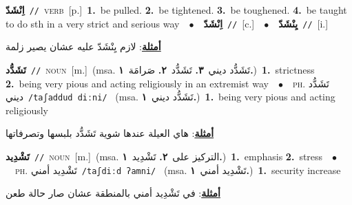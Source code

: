 \documentclass[10pt,a4paper,twoside]{article} %
\begin{document}
\begin{multicols}{2}
{\setlength\topsep{0pt}\textbf{\foreignlanguage{arabic}{اِنْشَدّ}}\ {\color{gray}\texttt{//}\color{black}}\ \textsc{verb}\ [p.]\ \textbf{1.}~be pulled.  \textbf{2.}~be tightened.  \textbf{3.}~be toughened.  \textbf{4.}~be taught to do sth in a very strict and serious way\ \ $\bullet$\ \ \setlength\topsep{0pt}\textbf{\foreignlanguage{arabic}{اِنْشَدّ}}\ {\color{gray}\texttt{//}\color{black}}\ [c.]\ \ $\bullet$\ \ \setlength\topsep{0pt}\textbf{\foreignlanguage{arabic}{يِنْشَدّ}}\ {\color{gray}\texttt{//}\color{black}}\ [i.]\  \begin{flushright}\color{gray}\foreignlanguage{arabic}{\textbf{\underline{\foreignlanguage{arabic}{أمثلة}}}: لازم يِنْشَدّ عليه عشان يصير زلمة}\end{flushright}\color{black}} \vspace{2mm}

{\setlength\topsep{0pt}\textbf{\foreignlanguage{arabic}{تَشَدُّد}}\ {\color{gray}\texttt{//}\color{black}}\ \textsc{noun}\ [m.]\ \color{gray}(msa. \foreignlanguage{arabic}{تَشَدُّد ديني}~\foreignlanguage{arabic}{\textbf{٣.}}  \foreignlanguage{arabic}{تَشَدُّد}~\foreignlanguage{arabic}{\textbf{٢.}}  \foreignlanguage{arabic}{صَرامَة}~\foreignlanguage{arabic}{\textbf{١.}})\color{black}\ \textbf{1.}~strictness  \textbf{2.}~being very pious and acting religiously in an extremist way\ \ $\bullet$\ \ \textsc{ph.} \color{gray} \foreignlanguage{arabic}{تَشَدُّد ديني}\color{black}\ {\color{gray}\texttt{/{\sffamily taʃaddud diːni}/}\color{black}}\ \color{gray} (msa. \foreignlanguage{arabic}{تَشَدُّد ديني}~\foreignlanguage{arabic}{\textbf{١.}})\color{black}\ \textbf{1.}~being very pious and acting religiously\  \begin{flushright}\color{gray}\foreignlanguage{arabic}{\textbf{\underline{\foreignlanguage{arabic}{أمثلة}}}: هاي العيلة عندها شوية تَشَدُّد بلبسها وتصرفاتها}\end{flushright}\color{black}} \vspace{2mm}

{\setlength\topsep{0pt}\textbf{\foreignlanguage{arabic}{تَشْدِيد}}\ {\color{gray}\texttt{//}\color{black}}\ \textsc{noun}\ [m.]\ \color{gray}(msa. \foreignlanguage{arabic}{التركيز على}~\foreignlanguage{arabic}{\textbf{٢.}}  \foreignlanguage{arabic}{تَشْدِيد}~\foreignlanguage{arabic}{\textbf{١.}})\color{black}\ \textbf{1.}~emphasis  \textbf{2.}~stress\ \ $\bullet$\ \ \textsc{ph.} \color{gray} \foreignlanguage{arabic}{تَشْدِيد أمني}\color{black}\ {\color{gray}\texttt{/{\sffamily taʃdiːd ʔamni}/}\color{black}}\ \color{gray} (msa. \foreignlanguage{arabic}{تَشْدِيد أمني}~\foreignlanguage{arabic}{\textbf{١.}})\color{black}\ \textbf{1.}~security increase\  \begin{flushright}\color{gray}\foreignlanguage{arabic}{\textbf{\underline{\foreignlanguage{arabic}{أمثلة}}}: في تَشْدِيد أمني بالمنطقة عشان صار حالة طعن}\end{flushright}\color{black}} \vspace{2mm}


\end{multicols}
\end{document}
